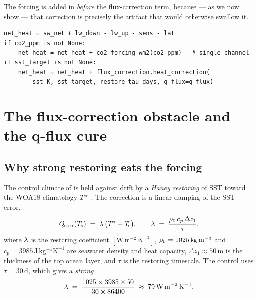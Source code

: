 The forcing is added in  \emph{before} the
flux-correction term, because --- as we now show --- that correction is precisely
the artifact that would otherwise swallow it.

\begin{lstlisting}[caption={Forcing enters the surface budget before flux correction.}]
net_heat = sw_net + lw_down - lw_up - sens - lat
if co2_ppm is not None:
    net_heat = net_heat + co2_forcing_wm2(co2_ppm)   # single channel
if sst_target is not None:
    net_heat = net_heat + flux_correction.heat_correction(
        sst_K, sst_target, restore_tau_days, q_flux=q_flux)
\end{lstlisting}

\section{The flux-correction obstacle and the q-flux cure}\label{sec:f14_qflux}

\subsection{Why strong restoring eats the forcing}

The control climate of \model{} is held against drift by a \emph{Haney
restoring} \citep{haney1971} of SST toward the WOA18 climatology $T^{\star}$
\citep{locarnini2018woa}. The correction is a
linear damping of the SST error,
\begin{equation}
  Q_{\mathrm{corr}}(T_{\mathrm{s}}) \;=\; \lambda\,\bigl(T^{\star} - T_{\mathrm{s}}\bigr),
  \qquad
  \lambda \;=\; \frac{\rho_0\, c_p\, \Delta z_1}{\tau},
  \label{eq:f14_haney}
\end{equation}
where $\lambda$ is the restoring coefficient $[\mathrm{W\,m^{-2}\,K^{-1}}]$,
$\rho_0=1025\,\mathrm{kg\,m^{-3}}$ and $c_p=3985\,\mathrm{J\,kg^{-1}K^{-1}}$ are
seawater density and heat capacity, $\Delta z_1\approx 50\,\mathrm{m}$ is the
thickness of the top ocean layer, and $\tau$ is the restoring timescale. The
control uses $\tau=30\,\mathrm{d}$, which gives a \emph{strong}
\begin{equation}
  \lambda \;=\; \frac{1025\times 3985\times 50}{30\times 86400}
  \;\approx\; 79\,\mathrm{W\,m^{-2}\,K^{-1}}.
  \label{eq:f14_lambda30}
\end{equation}

